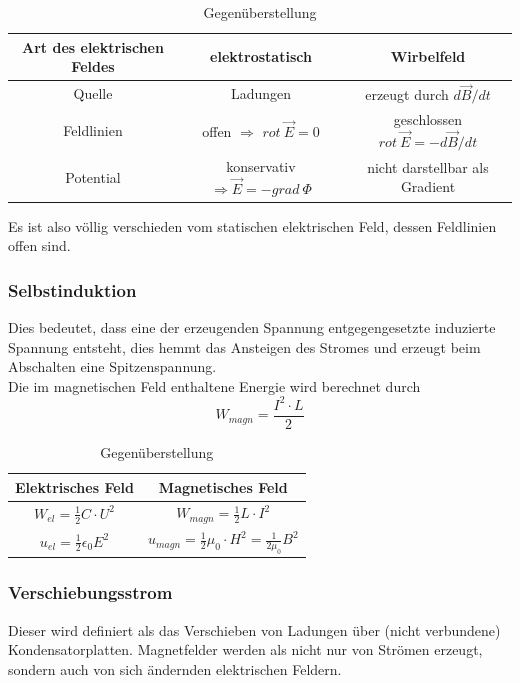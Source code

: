 \documentclass[12pt,a4paper,ngerman]{article}
\begin{document}
\begin{table}[h!]
  \begin{center}
    \begin{tabular}{| c |  c | c |}
    \hline
    Art des elektrischen Feldes & elektrostatisch & Wirbelfeld  \\ \hline \hline
    Quelle & 	Ladungen & erzeugt durch $d\vec{B}/dt$ \\ \hline
    Feldlinien & offen $\Rightarrow$ $rot \ \vec{E} = 0$ & geschlossen $rot \ \vec{E} = -d\vec{B}/dt$    \\ \hline
    Potential & konservativ $\Rightarrow \vec{E} = -grad \ \Phi$ & nicht darstellbar als Gradient \\ \hline
    \end{tabular}
  \end{center}
  \caption{Gegenüberstellung}
\end{table}
 Es ist also völlig verschieden vom statischen elektrischen Feld, dessen Feldlinien offen sind. 

\subsubsection*{Selbstinduktion}
Dies bedeutet, dass eine der erzeugenden Spannung entgegengesetzte induzierte Spannung entsteht, dies hemmt das Ansteigen des Stromes und erzeugt beim Abschalten eine Spitzenspannung. \\
Die im magnetischen Feld enthaltene Energie wird berechnet durch
\begin{equation}
W_{magn} = \frac{I^2\cdot L}{2}
\end{equation}

\begin{table}[h!]
  \begin{center}
    \begin{tabular}{| c | c |}
    \hline
    Elektrisches Feld & Magnetisches Feld  \\ \hline \hline
    $W_{el} = \frac{1}{2} C \cdot U^2$ & $W_{magn} = \frac{1}{2} L \cdot I^2$ \\ \hline
    $u_{el} = \frac{1}{2}\epsilon_0 E^2$ & $u_{magn} = \frac{1}{2}\mu_0 \cdot H^2 = \frac{1}{2\mu_0}B^2$ \\ \hline
    \end{tabular}
  \end{center}
  \caption{Gegenüberstellung}
\end{table}

\subsubsection*{Verschiebungsstrom}
Dieser wird definiert als das Verschieben von Ladungen über (nicht verbundene) Kondensatorplatten. Magnetfelder werden als nicht nur von Strömen erzeugt, sondern auch von sich ändernden elektrischen Feldern. 
\end{document}

